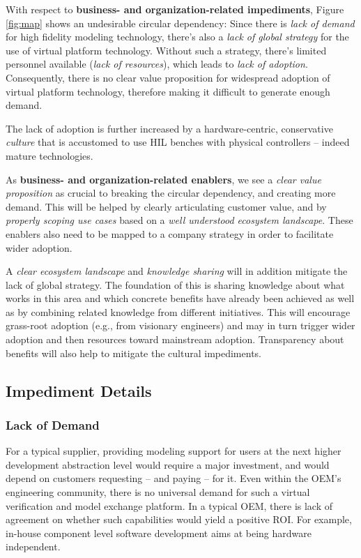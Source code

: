 With respect to \textbf{business- and organization-related impediments}, Figure \ref{fig:map} shows an undesirable circular dependency:
Since there is \emph{lack of demand} for high fidelity modeling technology,
there's also a \emph{lack of global strategy} for the use of virtual platform technology.
Without such a strategy, there's limited personnel available (\emph{lack of resources}),
which leads to \emph{lack of adoption}.
Consequently, there is no clear value proposition for widespread adoption of virtual platform technology, therefore making it difficult to generate enough demand.

The lack of adoption is further increased by a hardware-centric, conservative \emph{culture} that is accustomed to use HIL benches with physical controllers -- indeed mature technologies.

As \textbf{business- and organization-related enablers}, %
we see a \emph{clear value proposition} as crucial to breaking the circular dependency, and creating more demand.
This will be helped by clearly articulating customer value, and by \emph{properly scoping use cases} based on a \emph{well understood ecosystem landscape}.
These enablers also need to be mapped to a company strategy in order to facilitate wider adoption. 

A \emph{clear ecosystem landscape} and \emph{knowledge sharing} will in addition mitigate the lack of global strategy.
The foundation of this is sharing knowledge about what works in this area and which concrete benefits have already been achieved as well as by combining related knowledge from different initiatives.
This will encourage grass-root adoption (e.g., from visionary engineers) and may in turn trigger wider adoption and then resources toward mainstream adoption.
Transparency about benefits will also help to mitigate the cultural impediments.

\subsection{Impediment Details}
\subsubsection*{Lack of Demand}
For a typical supplier,
providing modeling support for users at the next higher development abstraction level would require a major investment,
and would depend on customers requesting -- and paying -- for it.
%
Even within the OEM’s engineering community, there is no universal demand
for such a virtual verification and model exchange platform.
In a typical OEM, there is lack of agreement on whether such capabilities would yield a positive ROI.
For example, in-house component level software development aims at being hardware independent.


